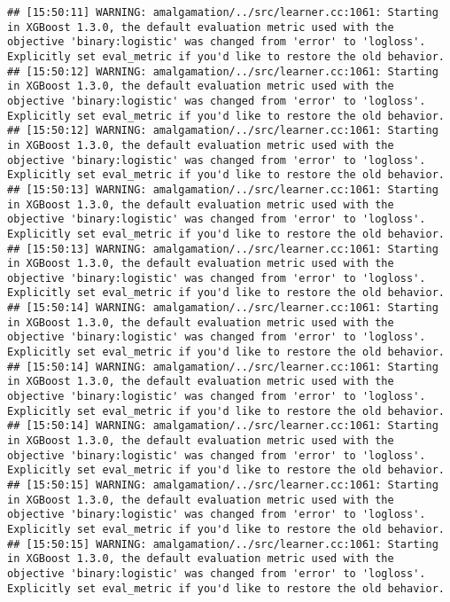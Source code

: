\documentclass[
]{book}
\begin{document}
\begin{verbatim}
## [15:50:11] WARNING: amalgamation/../src/learner.cc:1061: Starting in XGBoost 1.3.0, the default evaluation metric used with the objective 'binary:logistic' was changed from 'error' to 'logloss'. Explicitly set eval_metric if you'd like to restore the old behavior.
## [15:50:12] WARNING: amalgamation/../src/learner.cc:1061: Starting in XGBoost 1.3.0, the default evaluation metric used with the objective 'binary:logistic' was changed from 'error' to 'logloss'. Explicitly set eval_metric if you'd like to restore the old behavior.
## [15:50:12] WARNING: amalgamation/../src/learner.cc:1061: Starting in XGBoost 1.3.0, the default evaluation metric used with the objective 'binary:logistic' was changed from 'error' to 'logloss'. Explicitly set eval_metric if you'd like to restore the old behavior.
## [15:50:13] WARNING: amalgamation/../src/learner.cc:1061: Starting in XGBoost 1.3.0, the default evaluation metric used with the objective 'binary:logistic' was changed from 'error' to 'logloss'. Explicitly set eval_metric if you'd like to restore the old behavior.
## [15:50:13] WARNING: amalgamation/../src/learner.cc:1061: Starting in XGBoost 1.3.0, the default evaluation metric used with the objective 'binary:logistic' was changed from 'error' to 'logloss'. Explicitly set eval_metric if you'd like to restore the old behavior.
## [15:50:14] WARNING: amalgamation/../src/learner.cc:1061: Starting in XGBoost 1.3.0, the default evaluation metric used with the objective 'binary:logistic' was changed from 'error' to 'logloss'. Explicitly set eval_metric if you'd like to restore the old behavior.
## [15:50:14] WARNING: amalgamation/../src/learner.cc:1061: Starting in XGBoost 1.3.0, the default evaluation metric used with the objective 'binary:logistic' was changed from 'error' to 'logloss'. Explicitly set eval_metric if you'd like to restore the old behavior.
## [15:50:14] WARNING: amalgamation/../src/learner.cc:1061: Starting in XGBoost 1.3.0, the default evaluation metric used with the objective 'binary:logistic' was changed from 'error' to 'logloss'. Explicitly set eval_metric if you'd like to restore the old behavior.
## [15:50:15] WARNING: amalgamation/../src/learner.cc:1061: Starting in XGBoost 1.3.0, the default evaluation metric used with the objective 'binary:logistic' was changed from 'error' to 'logloss'. Explicitly set eval_metric if you'd like to restore the old behavior.
## [15:50:15] WARNING: amalgamation/../src/learner.cc:1061: Starting in XGBoost 1.3.0, the default evaluation metric used with the objective 'binary:logistic' was changed from 'error' to 'logloss'. Explicitly set eval_metric if you'd like to restore the old behavior.

\end{verbatim}
\end{document}
